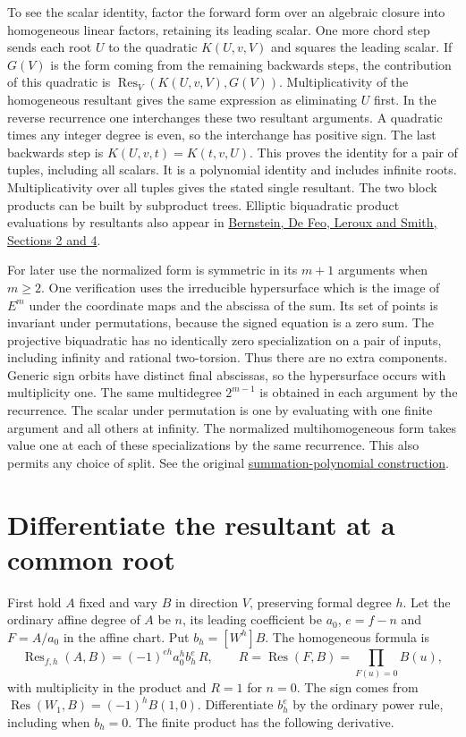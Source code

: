 \documentclass[11pt]{article}
\newcommand{\Res}{\operatorname{Res}}
\begin{document}
To see the scalar identity, factor the forward form over an algebraic
closure into homogeneous linear factors, retaining its leading
scalar. One more chord step sends each root $U$ to the quadratic
$K(U,v,V)$ and squares the leading scalar. If $G(V)$ is the form
coming from the remaining backwards steps, the contribution of this
quadratic is $\Res_V(K(U,v,V),G(V))$. Multiplicativity of the
homogeneous resultant gives the same expression as eliminating $U$
first. In the reverse recurrence one interchanges these two resultant
arguments. A quadratic times any integer degree is even, so the
interchange has positive sign. The last backwards step is
$K(U,v,t)=K(t,v,U)$. This proves the identity for a pair of tuples,
including all scalars. It is a polynomial identity and includes
infinite roots. Multiplicativity over all tuples gives the stated
single resultant. The two block products can be built by subproduct
trees. Elliptic biquadratic product evaluations by resultants also
appear in \href{https://velusqrt.isogeny.org/velusqrt-20200616.pdf}
{Bernstein, De Feo, Leroux and Smith, Sections 2 and 4}.

For later use the normalized form is symmetric in its $m+1$
arguments when $m\ge2$. One verification uses the irreducible
hypersurface which is the image of $E^m$ under the coordinate maps
and the abscissa of the sum. Its set of points is invariant under
permutations, because the signed equation is a zero sum. The
projective biquadratic has no identically zero specialization on
a pair of inputs, including infinity and rational two-torsion.
Thus there are no extra components. Generic sign orbits have
distinct final abscissas, so the hypersurface occurs with
multiplicity one. The same multidegree $2^{m-1}$ is obtained in
each argument by the recurrence. The scalar under permutation is
one by evaluating with one finite argument and all others at
infinity. The normalized multihomogeneous form takes value one at
each of these specializations by the same recurrence. This also
permits any choice of split. See the original
\href{https://eprint.iacr.org/2004/031}{summation-polynomial construction}.

\section{Differentiate the resultant at a common root}
First hold $A$ fixed and vary $B$ in direction $V$, preserving
formal degree $h$. Let the ordinary affine degree of $A$ be $n$,
its leading coefficient be $a_0$, $e=f-n$ and $F=A/a_0$ in
the affine chart. Put $b_h=[W^h]B$. The homogeneous formula is
\[
 \Res_{f,h}(A,B)=(-1)^{eh}a_0^h b_h^e\,R,\qquad
 R=\Res(F,B)=\prod_{F(u)=0}B(u),
\]
with multiplicity in the product and $R=1$ for $n=0$.
The sign comes from $\Res(W_1,B)=(-1)^h B(1,0)$.
Differentiate $b_h^e$ by the ordinary power rule, including when
$b_h=0$. The finite product has the following derivative.
\end{document}

